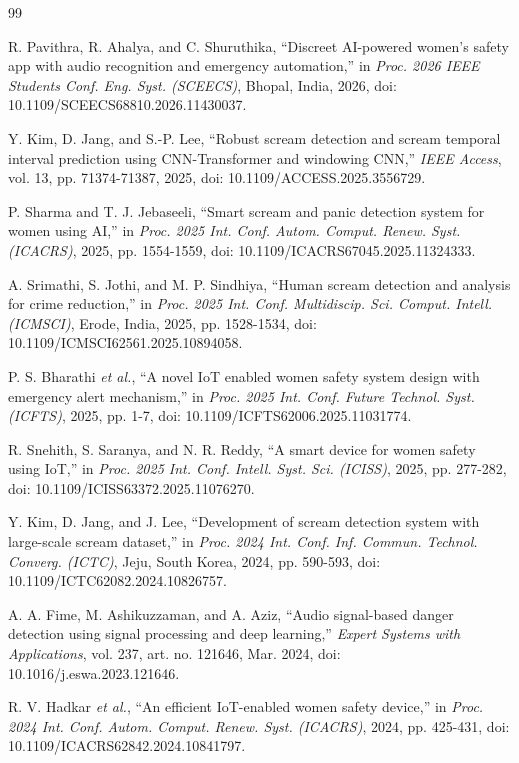 \documentclass[journal]{IEEEtran}
\begin{document}
\begin{thebibliography}{99}

R. Pavithra, R. Ahalya, and C. Shuruthika, ``Discreet AI-powered women's
safety app with audio recognition and emergency automation,'' in \emph{Proc.
2026 IEEE Students Conf. Eng. Syst. (SCEECS)}, Bhopal, India, 2026, doi:
10.1109/SCEECS68810.2026.11430037.

Y. Kim, D. Jang, and S.-P. Lee, ``Robust scream detection and scream
temporal interval prediction using CNN-Transformer and windowing CNN,''
\emph{IEEE Access}, vol. 13, pp. 71374-71387, 2025, doi:
10.1109/ACCESS.2025.3556729.

P. Sharma and T. J. Jebaseeli, ``Smart scream and panic detection system for
women using AI,'' in \emph{Proc. 2025 Int. Conf. Autom. Comput. Renew. Syst.
(ICACRS)}, 2025, pp. 1554-1559, doi: 10.1109/ICACRS67045.2025.11324333.

A. Srimathi, S. Jothi, and M. P. Sindhiya, ``Human scream detection and
analysis for crime reduction,'' in \emph{Proc. 2025 Int. Conf. Multidiscip.
Sci. Comput. Intell. (ICMSCI)}, Erode, India, 2025, pp. 1528-1534, doi:
10.1109/ICMSCI62561.2025.10894058.

P. S. Bharathi \emph{et al.}, ``A novel IoT enabled women safety system
design with emergency alert mechanism,'' in \emph{Proc. 2025 Int. Conf.
Future Technol. Syst. (ICFTS)}, 2025, pp. 1-7, doi:
10.1109/ICFTS62006.2025.11031774.

R. Snehith, S. Saranya, and N. R. Reddy, ``A smart device for women safety
using IoT,'' in \emph{Proc. 2025 Int. Conf. Intell. Syst. Sci. (ICISS)},
2025, pp. 277-282, doi: 10.1109/ICISS63372.2025.11076270.

Y. Kim, D. Jang, and J. Lee, ``Development of scream detection system with
large-scale scream dataset,'' in \emph{Proc. 2024 Int. Conf. Inf. Commun.
Technol. Converg. (ICTC)}, Jeju, South Korea, 2024, pp. 590-593, doi:
10.1109/ICTC62082.2024.10826757.

A. A. Fime, M. Ashikuzzaman, and A. Aziz, ``Audio signal-based danger
detection using signal processing and deep learning,'' \emph{Expert Systems
with Applications}, vol. 237, art. no. 121646, Mar. 2024, doi:
10.1016/j.eswa.2023.121646.

R. V. Hadkar \emph{et al.}, ``An efficient IoT-enabled women safety
device,'' in \emph{Proc. 2024 Int. Conf. Autom. Comput. Renew. Syst.
(ICACRS)}, 2024, pp. 425-431, doi: 10.1109/ICACRS62842.2024.10841797.


\end{thebibliography}
\end{document}

